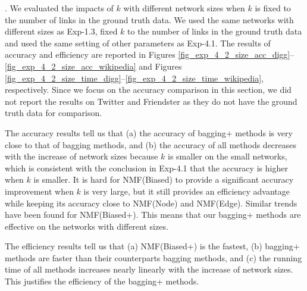 \documentclass[10pt,journal,compsoc]{IEEEtran}
\newcommand{\stitle}[1]{\vspace{0.5ex}\noindent{\bf #1}}
\newcommand{\Node}{{\sf NMF(Node)}\xspace}
\newcommand{\Edge}{{\sf NMF(Edge)}\xspace}
\newcommand{\Biased}{{\sf NMF(Biased)}\xspace}
\newcommand{\Twitter}{{\sf Twitter}\xspace}
\newcommand{\Friendster}{{\sf Friendster}\xspace}
\newcommand{\Biasedp}{{\sf NMF(Biased+)}\xspace}
\begin{document}
\stitle{Exp-4.2: Impacts of network sizes}. We evaluated the impacts of $k$ with
different network sizes when $k$ is fixed to the number of links in the ground truth data.
We used the same networks with different sizes as Exp-1.3,
fixed $k$ to the number of links in the ground truth data
and used the same setting of other parameters as Exp-4.1.
The results of accuracy and efficiency are reported
in Figures \ref{fig_exp_4_2_size_acc_digg}--\ref{fig_exp_4_2_size_acc_wikipedia} and
Figures \ref{fig_exp_4_2_size_time_digg}--\ref{fig_exp_4_2_size_time_wikipedia}, respectively.
Since we focus on the accuracy comparison in
this section, we did not report the results on \Twitter and \Friendster
as they do not have the ground truth data for comparison.

The accuracy results tell us that (a) the accuracy of bagging+ methods is very close to
that of bagging methods, and (b) the accuracy of all methods decreases with the
increase of network sizes because $k$ is smaller on the small networks, which is consistent
with the conclusion in Exp-4.1 that the accuracy is higher when $k$ is smaller. It is hard
for \Biased to provide a significant accuracy improvement when $k$ is very large, but it still provides
an efficiency advantage while keeping its accuracy close to \Node and \Edge. Similar trends have been found for \Biasedp. 
This means that our bagging+ methods are effective on the networks with different sizes.

The efficiency results tell us that (a) \Biasedp is the fastest, (b) bagging+ methods are faster than their counterparts bagging
methods, and (c) the running time of all methods increases nearly linearly with the
increase of network sizes. This justifies the efficiency of the bagging+ methods.
\end{document}
